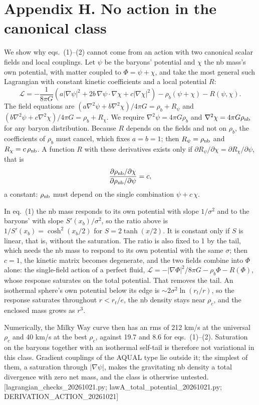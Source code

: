 \documentclass[
  10pt,
]{article}
\begin{document}
\section{Appendix H. No action in the canonical class}\label{appendix-h}

We show why eqs.~(1)--(2) cannot come from an action with two canonical scalar fields and local couplings. Let $\psi$ be the baryons' potential and $\chi$ the nb mass's own potential, with matter coupled to $\Phi=\psi+\chi$, and take the most general such Lagrangian with constant kinetic coefficients and a local potential $R$:
\[
\mathcal{L}=-\frac{1}{8\pi G}\left(a|\nabla\psi|^2+2b\,\nabla\psi\cdot\nabla\chi+c|\nabla\chi|^2\right)-\rho_b(\psi+\chi)-R(\psi,\chi).
\]
The field equations are $(a\nabla^2\psi+b\nabla^2\chi)/4\pi G=\rho_b+R_\psi$ and $(b\nabla^2\psi+c\nabla^2\chi)/4\pi G=\rho_b+R_\chi$. We require $\nabla^2\psi=4\pi G\rho_b$ and $\nabla^2\chi=4\pi G\rho_{\rm nb}$ for any baryon distribution. Because $R$ depends on the fields and not on $\rho_b$, the coefficients of $\rho_b$ must cancel, which fixes $a=b=1$; then $R_\psi=\rho_{\rm nb}$ and $R_\chi=c\,\rho_{\rm nb}$. A function $R$ with these derivatives exists only if $\partial R_\psi/\partial\chi=\partial R_\chi/\partial\psi$, that is
\[
\frac{\partial\rho_{\rm nb}/\partial\chi}{\partial\rho_{\rm nb}/\partial\psi}=c,
\]
a constant: $\rho_{\rm nb}$ must depend on the single combination $\psi+c\,\chi$.

In eq.~(1) the nb mass responds to its own potential with slope $1/\sigma^2$ and to the baryons' with slope $S'(x_b)/\sigma^2$, so the ratio above is $1/S'(x_b)=\cosh^2(x_b/2)$ for $S=2\tanh(x/2)$. It is constant only if $S$ is linear, that is, without the saturation. The ratio is also fixed to 1 by the tail, which needs the nb mass to respond to its own potential with the same $\sigma$; then $c=1$, the kinetic matrix becomes degenerate, and the two fields combine into $\Phi$ alone: the single-field action of a perfect fluid, $\mathcal{L}=-|\nabla\Phi|^2/8\pi G-\rho_b\Phi-R(\Phi)$, whose response saturates on the total potential. That removes the tail. An isothermal sphere's own potential below its edge is $\sim2\sigma^2\ln(r_t/r)$, so the response saturates throughout $r<r_t/e$, the nb density stays near $\rho_c$, and the enclosed mass grows as $r^3$.

Numerically, the Milky Way curve then has an rms of 212 km/s at the universal $\rho_c$ and 40 km/s at the best $\rho_c$, against 19.7 and 8.6 for eqs.~(1)--(2). Saturation on the baryons together with an isothermal self-tail is therefore not variational in this class. Gradient couplings of the AQUAL type lie outside it; the simplest of them, a saturation through $|\nabla\psi|$, makes the gravitating nb density a total divergence with zero net mass, and the class is otherwise untested. {[}lagrangian\_checks\_20261021.py; lawA\_total\_potential\_20261021.py; DERIVATION\_ACTION\_20261021{]}
\end{document}
